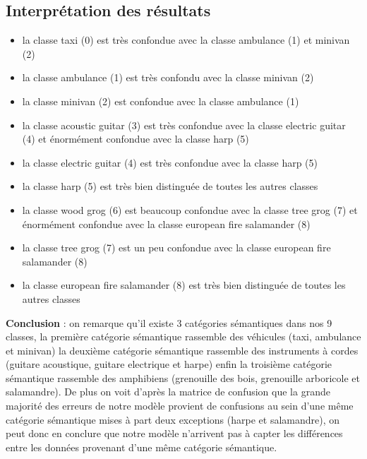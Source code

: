 \documentclass[a4paper]{article}
\begin{document}
\subsection{Interprétation des résultats}
\begin{itemize}
\item la classe taxi (0) est très confondue avec la classe ambulance (1) et minivan (2)
\item la classe ambulance (1) est très confondu avec la classe minivan (2)
\item la classe minivan (2) est confondue avec la classe ambulance (1)
\item la classe acoustic guitar (3) est très confondue avec la classe electric guitar (4) et énormément confondue avec la classe harp (5)
\item la classe electric guitar (4) est très confondue avec la classe harp (5)
\item la classe harp (5) est très bien distinguée de toutes les autres classes
\item la classe wood grog (6) est beaucoup confondue avec la classe tree grog (7) et énormément confondue avec la classe european fire salamander (8)
\item la classe tree grog (7) est un peu confondue avec la classe european fire salamander (8)
\item la classe european fire salamander (8) est très bien distinguée de toutes les autres classes
\end{itemize}
\textbf{Conclusion} : on remarque qu'il existe 3 catégories sémantiques dans nos 9 classes, la première catégorie sémantique rassemble des véhicules (taxi, ambulance et minivan) la deuxième catégorie sémantique rassemble des instruments à cordes (guitare acoustique, guitare electrique et harpe) enfin la troisième catégorie sémantique rassemble des amphibiens (grenouille des bois, grenouille arboricole et salamandre). De plus on voit d'après la matrice de confusion que la grande majorité des erreurs de notre modèle provient de confusions au sein d'une même catégorie sémantique mises à part deux exceptions (harpe et salamandre), on peut donc en conclure que notre modèle n'arrivent pas à capter les différences entre les données provenant d'une même catégorie sémantique.
\end{document}

